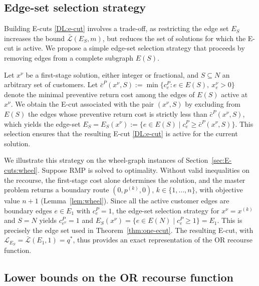\documentclass{article}
\newcommand{\rev}[1]{{\color{black}#1}}
\begin{document}

\subsection{\rev{Edge-set selection strategy}} \label{sec:E-cuts:strategy}

Building E-cuts \eqref{DL:e-cut} involves a trade-off, as restricting the edge set $E_S$ increases the bound $\bar{\mathcal{L}}(E_S, m)$, but reduces the set of solutions for which the E-cut is active. We propose a simple edge-set selection strategy \rev{that proceeds by removing edges from a complete subgraph $E(S)$.} 

Let $x^{\nu}$ be a first-stage solution, either integer or fractional, and $S \subseteq N$ an arbitrary set of customers. \rev{Let $\bar{c}^P(x^{\nu}, S) := \min\{c^P_e : e \in E(S), \  x^{\nu}_e > 0\}$ denote the minimal preventive return cost among the edges of $E(S)$ active at $x^{\nu}$. We obtain the E-cut associated with the pair $(x^{\nu}, S)$ by excluding from $E(S)$ the edges whose preventive return cost is strictly less than $\bar{c}^P(x^{\nu}, S)$, which yields the edge-set $E_S = E_S(x^{\nu}) := \{e \in E(S) \mid c^P_e \geq \bar{c}^P(x^{\nu}, S)\}$.} This selection ensures that the resulting E-cut \eqref{DL:e-cut} is active for the current solution. 

\rev{We illustrate this strategy on the wheel-graph instances of Section~\ref{sec:E-cuts:wheel}. Suppose RMP is solved to optimality. Without valid inequalities on the recourse, the first-stage cost alone determines the solution, and the master problem returns a boundary route $(0,p^{(k)},0)$, $k \in \{1,\dots,n\}$, with objective value $n+1$ (Lemma~\ref{lem:wheel}). Since all the active customer edges are boundary edges $e \in E_1$ with $c^P_e = 1$, the edge-set selection strategy for $x^{\nu} = x^{(k)}$ and $S=N$ yields $c^P_{e^{\nu}} = 1$ and $E_S(x^{\nu}) = \{e \in E(N) \mid c^P_e \geq 1\} = E_1$. This is precisely the edge set used in Theorem~\ref{thm:one-ecut}. The resulting E-cut, with $\mathcal{L}_{E_S} = \bar{\mathcal{L}}(E_1,1) = q^*$, thus provides an exact representation of the OR recourse function.}


\subsection{Lower bounds on the OR recourse function}\label{sec:bounds}
\end{document}
